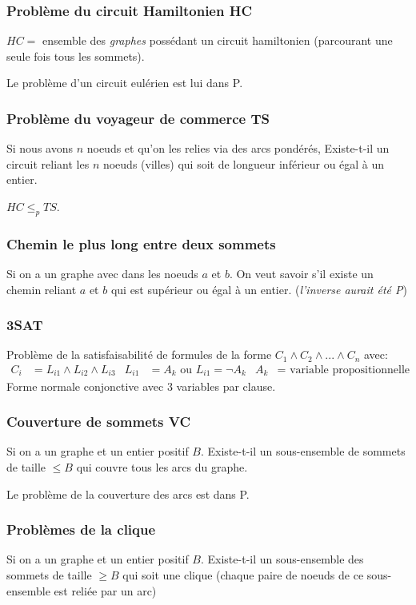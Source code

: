 \documentclass{report}
\begin{document}
\subsubsection{Problème du circuit Hamiltonien HC} 
$HC =$ ensemble des \textit{graphes} possédant un circuit hamiltonien (parcourant une seule fois tous les sommets).\par 
Le problème d'un circuit eulérien est lui dans P.

\subsubsection{Problème du voyageur de commerce TS}
Si nous avons $n$ noeuds et qu'on les relies via des arcs pondérés, Existe-t-il un circuit reliant les $n$ noeuds (villes) qui soit de longueur inférieur ou égal à un entier.\par 
$HC \leqslant_p TS$.

\subsubsection{Chemin le plus long entre deux sommets}
Si on a un graphe avec dans les noeuds $a$ et $b$. On veut savoir s'il existe un chemin reliant $a$ et $b$ qui est supérieur ou égal à un entier. (\textit{l'inverse aurait été P})

\subsubsection{3SAT}
Problème de la satisfaisabilité de formules de la forme $C_1 \wedge C_2 \wedge ... \wedge C_n$ avec:
\begin{align*}
C_i &= L_{i1} \wedge L_{i2} \wedge L_{i3} &  L_{i1} &= A_k \text{ ou }  L_{i1} = \neg A_k & A_k &= \text{ variable propositionnelle}
\end{align*}
Forme normale conjonctive avec $3$ variables par clause.

\subsubsection{Couverture de sommets VC}
Si on a un graphe et un entier positif $B$. Existe-t-il un sous-ensemble de sommets de taille $\leqslant B$ qui couvre tous les arcs du graphe.\par 
Le problème de la couverture des arcs est dans P.

\subsubsection{Problèmes de la clique}
Si on a un graphe et un entier positif $B$. Existe-t-il un sous-ensemble des sommets de taille $\geqslant B$ qui soit une clique (chaque paire de noeuds de ce sous-ensemble est reliée par un arc)
\end{document}
